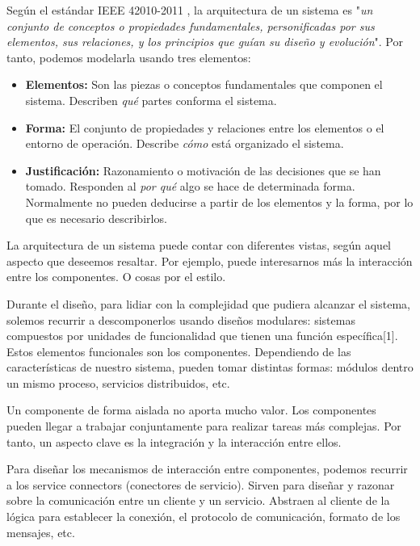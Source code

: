 Según el estándar IEEE 42010-2011 \cite{ieeeStandard420102011Systems2011}, la arquitectura de un sistema es "\textit{un conjunto de conceptos o propiedades fundamentales, personificadas por sus elementos, sus relaciones, y los principios que guían su diseño y evolución}". Por tanto, podemos modelarla usando tres elementos: \cite{perryFoundationsStudySoftware1992} 
    \begin{itemize}
        \item \textbf{Elementos:} Son las piezas o conceptos fundamentales que componen el sistema. Describen \textit{qué} partes conforma el sistema.
        
        \item \textbf{Forma:} El conjunto de propiedades y relaciones entre los elementos o el entorno de operación. Describe \textit{cómo} está organizado el sistema. 
        
        \item \textbf{Justificación:} Razonamiento o motivación de las decisiones que se han tomado. Responden al \textit{por qué} algo se hace de determinada forma. Normalmente no pueden deducirse a partir de los elementos y la forma, por lo que es necesario describirlos.
    \end{itemize}

La arquitectura de un sistema puede contar con diferentes vistas, según aquel aspecto que deseemos resaltar. Por ejemplo, puede interesarnos más la interacción entre los componentes. O cosas por el estilo.

Durante el diseño, para lidiar con la complejidad que pudiera alcanzar el sistema, solemos recurrir a descomponerlos usando diseños modulares: sistemas compuestos por unidades de funcionalidad que tienen una función específica[1]. Estos elementos funcionales son los componentes. Dependiendo de las características de nuestro sistema, pueden tomar distintas formas: módulos dentro un mismo proceso, servicios distribuidos, etc.

Un componente de forma aislada no aporta mucho valor. Los componentes pueden llegar a trabajar conjuntamente para realizar tareas más complejas. Por tanto, un aspecto clave es la integración y la interacción entre ellos. \cite{mehtaTaxonomySoftwareConnectors2000}

Para diseñar los mecanismos de interacción entre componentes, podemos recurrir a los service connectors (conectores de servicio). Sirven para diseñar y razonar sobre la comunicación entre un cliente y un servicio. Abstraen al cliente de la lógica para establecer la conexión, el protocolo de comunicación, formato de los mensajes, etc. 
